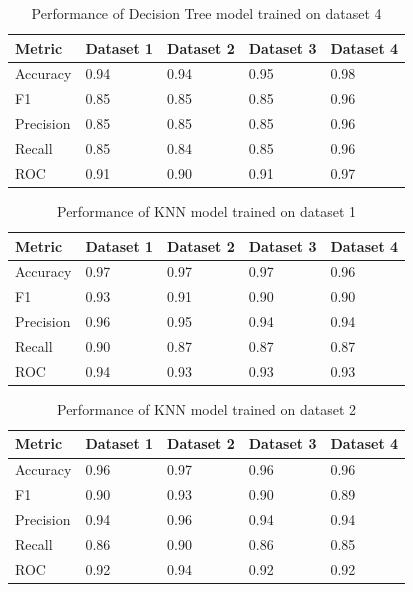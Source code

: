 \begin{table}[hbt]
\caption{Performance of Decision Tree model trained on dataset 4}\label{tab:performance_of_decision_tree_model_trained_on_dataset_4}
\begin{tabular*}{\tblwidth}{@{}LLLLL@{}}
\toprule
    Metric & Dataset 1 & Dataset 2 & Dataset 3 & Dataset 4 \\
\midrule
    Accuracy & 0.94 & 0.94 & 0.95 & 0.98 \\
    F1 & 0.85 & 0.85 & 0.85 & 0.96 \\
    Precision & 0.85 & 0.85 & 0.85 & 0.96 \\
    Recall & 0.85 & 0.84 & 0.85 & 0.96 \\
    ROC & 0.91 & 0.90 & 0.91 & 0.97 \\
\bottomrule
\end{tabular*}
\end{table}

\begin{table}[hbt]
\caption{Performance of KNN model trained on dataset 1}\label{tab:performance_of_knn_model_trained_on_dataset_1}
\begin{tabular*}{\tblwidth}{@{}LLLLL@{}}
\toprule
    Metric & Dataset 1 & Dataset 2 & Dataset 3 & Dataset 4 \\
\midrule
    Accuracy & 0.97 & 0.97 & 0.97 & 0.96 \\
    F1 & 0.93 & 0.91 & 0.90 & 0.90 \\
    Precision & 0.96 & 0.95 & 0.94 & 0.94 \\
    Recall & 0.90 & 0.87 & 0.87 & 0.87 \\
    ROC & 0.94 & 0.93 & 0.93 & 0.93 \\
\bottomrule
\end{tabular*}
\end{table}

\begin{table}[hbt]
\caption{Performance of KNN model trained on dataset 2}\label{tab:performance_of_knn_model_trained_on_dataset_2}
\begin{tabular*}{\tblwidth}{@{}LLLLL@{}}
\toprule
    Metric & Dataset 1 & Dataset 2 & Dataset 3 & Dataset 4 \\
\midrule
    Accuracy & 0.96 & 0.97 & 0.96 & 0.96 \\
    F1 & 0.90 & 0.93 & 0.90 & 0.89 \\
    Precision & 0.94 & 0.96 & 0.94 & 0.94 \\
    Recall & 0.86 & 0.90 & 0.86 & 0.85 \\
    ROC & 0.92 & 0.94 & 0.92 & 0.92 \\
\bottomrule
\end{tabular*}
\end{table}

